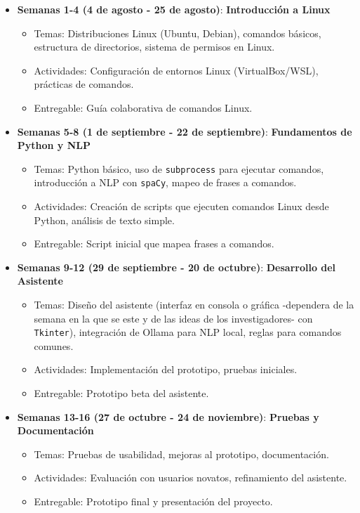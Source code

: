\documentclass[conference, a4paper]{IEEEtran}
\begin{document}
\begin{itemize}
    \item \textbf{Semanas 1-4 (4 de agosto - 25 de agosto)}: \textbf{Introducción a Linux}
        \begin{itemize}
            \item Temas: Distribuciones Linux (Ubuntu, Debian), comandos básicos, estructura de directorios, sistema de permisos en Linux.
            \item Actividades: Configuración de entornos Linux (VirtualBox/WSL), prácticas de comandos.
            \item Entregable: Guía colaborativa de comandos Linux.
        \end{itemize}
    \item \textbf{Semanas 5-8 (1 de septiembre - 22 de septiembre)}: \textbf{Fundamentos de Python y NLP}
        \begin{itemize}
            \item Temas: Python básico, uso de \texttt{subprocess} para ejecutar comandos, introducción a NLP con \texttt{spaCy}, mapeo de frases a 
                         comandos.
            \item Actividades: Creación de scripts que ejecuten comandos Linux desde Python, análisis de texto simple.
            \item Entregable: Script inicial que mapea frases a comandos.
        \end{itemize}
    \item \textbf{Semanas 9-12 (29 de septiembre - 20 de octubre)}: \textbf{Desarrollo del Asistente}
        \begin{itemize}
            \item Temas: Diseño del asistente (interfaz en consola o gráfica -dependera de la semana en la que se este y de las ideas de los
                         investigadores- con \texttt{Tkinter}), integración de Ollama para NLP local, reglas para comandos comunes.
            \item Actividades: Implementación del prototipo, pruebas iniciales.
            \item Entregable: Prototipo beta del asistente.
        \end{itemize}
    \item \textbf{Semanas 13-16 (27 de octubre - 24 de noviembre)}: \textbf{Pruebas y Documentación}
        \begin{itemize}
            \item Temas: Pruebas de usabilidad, mejoras al prototipo, documentación.
            \item Actividades: Evaluación con usuarios novatos, refinamiento del asistente.
            \item Entregable: Prototipo final y presentación del proyecto.
        \end{itemize}
\end{itemize}
\end{document}
